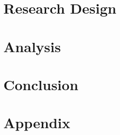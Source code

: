 \documentclass[11pt, letterpaper]{article} %
\begin{document}
\section{Research Design}

\blindtext %


\section{Analysis}

\blindtext %


\section{Conclusion}

\blindtext %

\newpage %

%



\newpage %
\section*{Appendix} %
\end{document}
